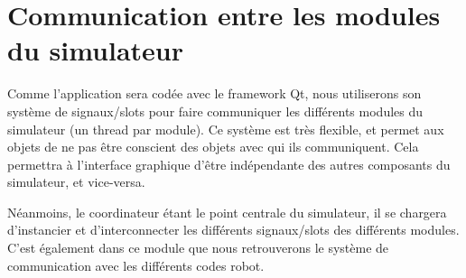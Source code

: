 
\section{Communication entre les modules du simulateur}

Comme l'application sera codée avec le framework Qt, nous utiliserons son système de signaux/slots pour faire communiquer les différents modules du simulateur (un thread par module). Ce système est très flexible, et permet aux objets de ne pas être conscient des objets avec qui ils communiquent. Cela permettra à l'interface graphique d'être indépendante des autres composants du simulateur, et vice-versa.

Néanmoins, le coordinateur étant le point centrale du simulateur, il se chargera d'instancier et d'interconnecter les différents signaux/slots des différents modules. C'est également dans ce module que nous retrouverons le système de communication avec les différents codes robot.